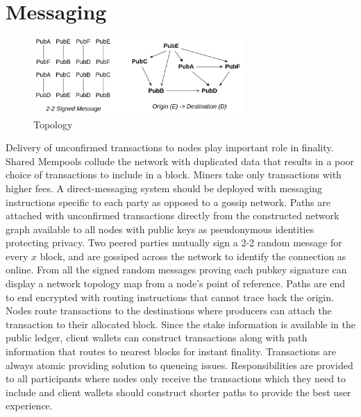\documentclass[a4paper,10pt]{article}
\begin{document}
\section{Messaging}
\begin{figure}[H]
\begin{center}
\includegraphics[width=8cm]{topology}
\caption{Topology}
\end{center}
\end{figure}
Delivery of unconfirmed transactions to nodes play important role in finality. Shared Mempools collude the network with duplicated data that results in a poor choice of transactions to include in a block. Miners take only transactions with higher fees. A direct-messaging system should be deployed with messaging instructions specific to each party as opposed to a gossip network. Paths are attached with unconfirmed transactions directly from the constructed network graph available to all nodes with public keys as pseudonymous identities protecting privacy. Two peered parties mutually sign a 2-2 random message for every $x$ block, and are gossiped across the network to identify the connection as online. From all the signed random messages proving each pubkey signature can display a network topology map from a node's point of reference. Paths are end to end encrypted with routing instructions that cannot trace back the origin. Nodes route transactions to the destinations where producers can attach the transaction to their allocated block. Since the stake information is available in the public ledger, client wallets can construct transactions along with path information that routes to nearest blocks for instant finality. Transactions are always atomic providing solution to queueing issues. Responsibilities are provided to all participants where nodes only receive the transactions which they need to include and client wallets should construct shorter paths to provide the best user experience.
\end{document}
